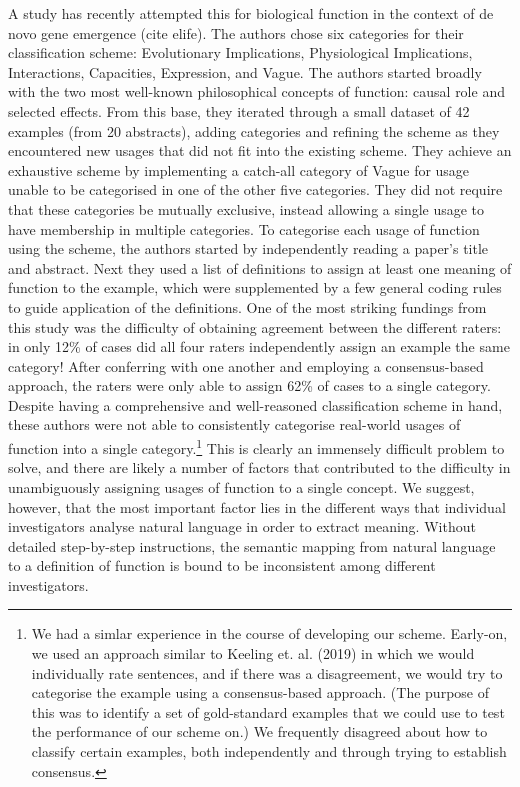 \documentclass{article}
\begin{document}
A study has recently attempted this for biological function in the context of de novo gene emergence (cite elife).
The authors chose six categories for their classification scheme: Evolutionary Implications, Physiological Implications, Interactions, Capacities, Expression, and Vague.
The authors started broadly with the two most well-known philosophical concepts of function: causal role and selected effects.
From this base, they iterated through a small dataset of 42 examples (from 20 abstracts), adding categories and refining the scheme as they encountered new usages that did not fit into the existing scheme.
They achieve an exhaustive scheme by implementing a catch-all category of Vague for usage unable to be categorised in one of the other five categories.
They did not require that these categories be mutually exclusive, instead allowing a single usage to have membership in multiple categories.
To categorise each usage of function using the scheme, the authors started by independently reading a paper's title and abstract.
Next they used a list of definitions to assign at least one meaning of function to the example, which were supplemented by a few general coding rules to guide application of the definitions.
One of the most striking fundings from this study was the difficulty of obtaining agreement between the different raters: in only 12\% of cases did all four raters independently assign an example the same category!
After conferring with one another and employing a consensus-based approach, the raters were only able to assign 62\% of cases to a single category.
Despite having a comprehensive and well-reasoned classification scheme in hand, these authors were not able to consistently categorise real-world usages of function into a single category.\footnote{We had a simlar experience in the course of developing our scheme. Early-on, we used an approach similar to Keeling et. al. (2019) in which we would individually rate sentences, and if there was a disagreement, we would try to categorise the example using a consensus-based approach. (The purpose of this was to identify a set of gold-standard examples that we could use to test the performance of our scheme on.) We frequently disagreed about how to classify certain examples, both independently and through trying to establish consensus.}
This is clearly an immensely difficult problem to solve, and there are likely a number of factors that contributed to the difficulty in unambiguously assigning usages of function to a single concept.
We suggest, however, that the most important factor lies in the different ways that individual investigators analyse natural language in order to extract meaning.
Without detailed step-by-step instructions, the semantic mapping from natural language to a definition of function is bound to be inconsistent among different investigators.
\end{document}
